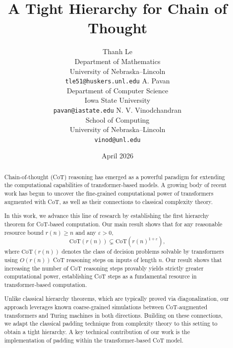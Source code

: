 \documentclass{article}
\title{A Tight Hierarchy for Chain of Thought}
\author{
  Thanh Le \\
  Department of Mathematics \\
  University of Nebraska--Lincoln \\
  \texttt{tle51@huskers.unl.edu}
  \And
  A. Pavan \\
  Department of Computer Science \\
  Iowa State University \\
  \texttt{pavan@iastate.edu}
  \And
  N. V. Vinodchandran \\
  School of Computing \\
  University of Nebraska--Lincoln \\
  \texttt{vinod@unl.edu}
}
\date{April 2026}
\theoremstyle{definition}
\newcommand{\0}{\mathbf{0}}
\newcommand{\CoT}{\mbox{\rm CoT}}
\newcommand{\1}{\mathbbm{1}}
\begin{document}
\maketitle


\begin{abstract}
Chain-of-thought (CoT) reasoning has emerged as a powerful paradigm for extending the computational capabilities of transformer-based models. A growing body of recent work has begun to uncover the fine-grained computational power of transformers augmented with CoT, as well as their connections to classical complexity theory.

In this work, we advance this line of research by establishing the first hierarchy theorem for \CoT-based computation. Our main result shows that for any reasonable resource bound $r(n) \geq n$  and any $\varepsilon > 0$,
\[
\mathrm{CoT}(r(n)) \subsetneq \mathrm{CoT}(r(n)^{1+\varepsilon}),
\]
where $\mathrm{CoT}(r(n))$  denotes the class of decision problems solvable by transformers using $O(r(n))$ CoT reasoning steps on inputs of length $n$. Our result shows that increasing the number of CoT reasoning steps provably yields strictly greater computational power, establishing CoT steps as a fundamental resource in transformer-based computation.

Unlike classical hierarchy theorems, which are typically proved via diagonalization, our approach leverages known coarse-grained simulations between CoT-augmented transformers and Turing machines in both directions. Building on these connections, we adapt the classical padding technique from complexity theory to this setting to obtain a tight hierarchy. A key technical contribution of our work is the implementation of padding within the transformer-based CoT model.
\end{abstract}



\end{document}
